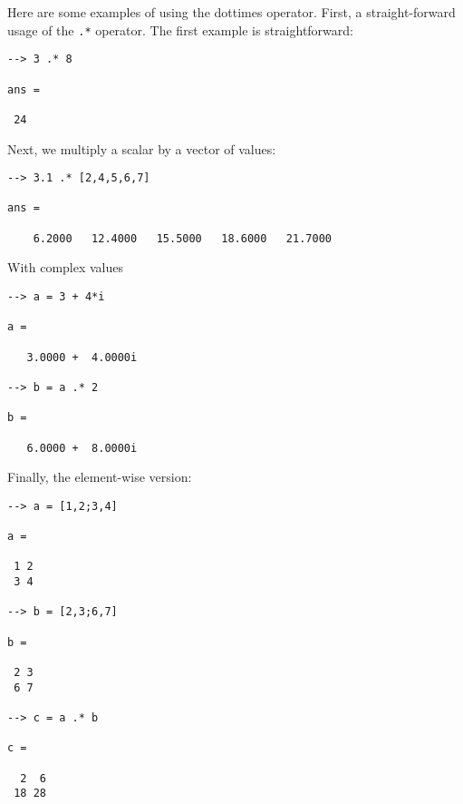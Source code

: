 Here are some examples of using the dottimes operator.  First, a 
straight-forward usage of the \verb|.*| operator.  The first example
is straightforward:
\begin{verbatim}
--> 3 .* 8

ans = 

 24 
\end{verbatim}
Next, we multiply a scalar by a vector of values:
\begin{verbatim}
--> 3.1 .* [2,4,5,6,7]

ans = 

    6.2000   12.4000   15.5000   18.6000   21.7000 
\end{verbatim}
With complex values
\begin{verbatim}
--> a = 3 + 4*i

a = 

   3.0000 +  4.0000i 

--> b = a .* 2

b = 

   6.0000 +  8.0000i 
\end{verbatim}
Finally, the element-wise version:
\begin{verbatim}
--> a = [1,2;3,4]

a = 

 1 2 
 3 4 

--> b = [2,3;6,7]

b = 

 2 3 
 6 7 

--> c = a .* b

c = 

  2  6 
 18 28 
\end{verbatim}
